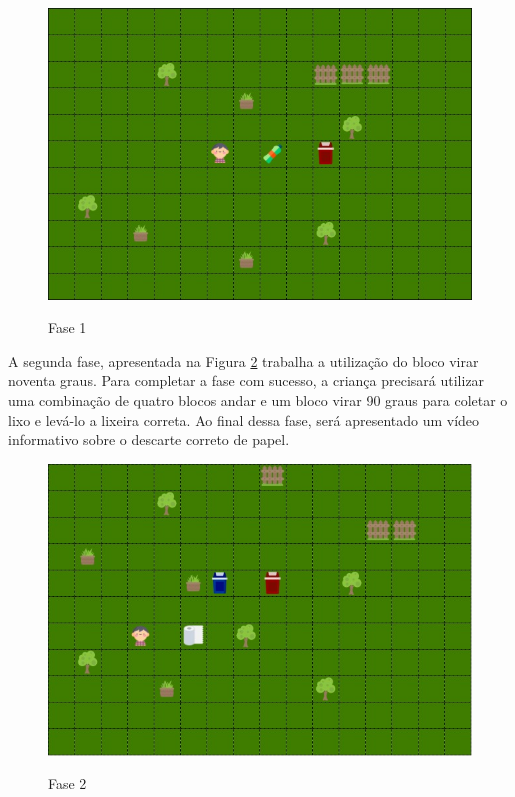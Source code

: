     \begin{figure}[H]
        \caption{Fase 1}
        \centering
        \includegraphics[width=12cm]{Imagens/Cap3/Fases/Fase1.jpg}
        \label{figura:fase_1}
    \end{figure}
    
    A segunda fase, apresentada na Figura \ref{figura:fase_2} trabalha a utilização do bloco virar noventa graus. Para completar a fase com sucesso, a criança precisará utilizar uma combinação de quatro blocos andar e um bloco virar 90 graus para coletar o lixo e levá-lo a lixeira correta. Ao final dessa fase, será apresentado um vídeo informativo sobre o descarte correto de papel.
    
    \begin{figure}[H]
        \caption{Fase 2}
        \centering
        \includegraphics[width=12cm]{Imagens/Cap3/Fases/Fase2.jpg}
        \label{figura:fase_2}
    \end{figure}
    
